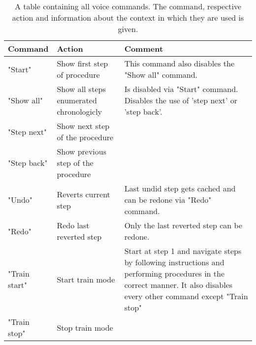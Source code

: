 \begin{table}[ht]
    \begin{center}
        \begin{tabular}{ | l | p{4cm} | p{8cm} |}
        \hline
        Command & Action & Comment \\ \hline
        "Start" & Show first step of procedure & This command also disables the "Show all" command. \\ \hline
        "Show all" & Show all steps enumerated chronologicly & Is disabled via "Start" command.
        Disables the use of 'step next' or 'step back'. \\ \hline
        "Step next" & Show next step of the procedure & \\ \hline
        "Step back" & Show previous step of the procedure & \\ \hline
        "Undo" & Reverts current step & Last undid step gets cached and can be redone via "Redo" command. \\ \hline
        "Redo" & Redo last reverted step & Only the last reverted step can be redone. \\ \hline
        "Train start" & Start train mode & Start at step 1 and navigate steps by following instructions and performing procedures in the correct manner.
        It also disables every other command except "Train stop" \\ \hline
        "Train stop" & Stop train mode & \\ \hline
        \end{tabular}
    \end{center}
    \caption{\label{table::VoiceCommands}A table containing all voice commands. The command, respective action and information about the context in which they are used is given.}
\end{table}

